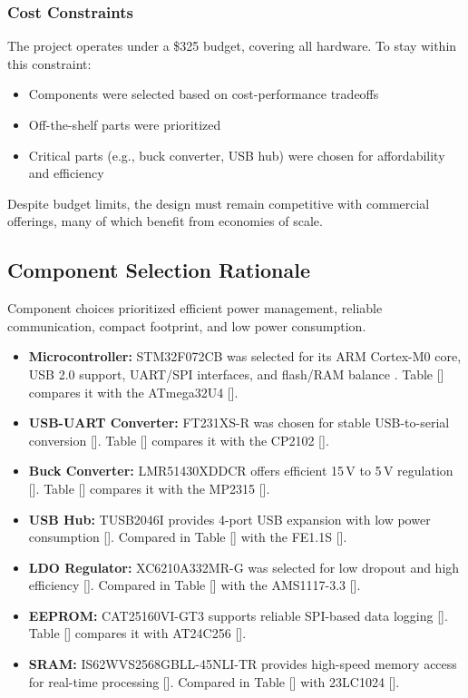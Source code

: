 \documentclass[12pt]{article}
\begin{document}
\subsubsection{Cost Constraints}

The project operates under a \$325 budget, covering all hardware. To stay within this constraint:
\begin{itemize}
    \item Components were selected based on cost-performance tradeoffs
    \item Off-the-shelf parts were prioritized
    \item Critical parts (e.g., buck converter, USB hub) were chosen for affordability and efficiency
\end{itemize}

Despite budget limits, the design must remain competitive with commercial offerings, many of which benefit from economies of scale.

\subsection{Component Selection Rationale}

Component choices prioritized efficient power management, reliable communication, compact footprint, and low power consumption.

\begin{itemize}
    \item \textbf{Microcontroller:} STM32F072CB was selected for its ARM Cortex-M0 core, USB 2.0 support, UART/SPI interfaces, and flash/RAM balance . Table [] compares it with the ATmega32U4 [].

    \item \textbf{USB-UART Converter:} FT231XS-R was chosen for stable USB-to-serial conversion []. Table [] compares it with the CP2102 [].

    \item \textbf{Buck Converter:} LMR51430XDDCR offers efficient 15\,V to 5\,V regulation []. Table [] compares it with the MP2315 [].

    \item \textbf{USB Hub:} TUSB2046I provides 4-port USB expansion with low power consumption []. Compared in Table [] with the FE1.1S [].

    \item \textbf{LDO Regulator:} XC6210A332MR-G was selected for low dropout and high efficiency []. Compared in Table [] with the AMS1117-3.3 [].

    \item \textbf{EEPROM:} CAT25160VI-GT3 supports reliable SPI-based data logging []. Table [] compares it with AT24C256 [].

    \item \textbf{SRAM:} IS62WVS2568GBLL-45NLI-TR provides high-speed memory access for real-time processing []. Compared in Table [] with 23LC1024 [].
\end{itemize}
\end{document}
